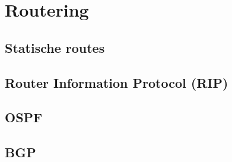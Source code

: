 \section{Routering}
\label{sec:routering}

\subsection{Statische routes}



\subsection{Router Information Protocol (RIP)}

\subsection{OSPF}

\subsection{BGP}

